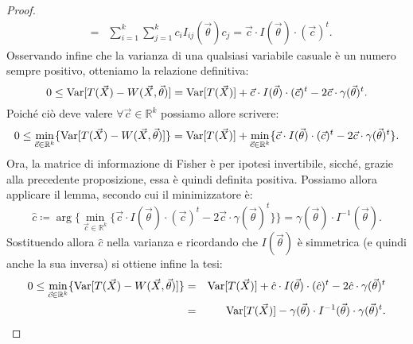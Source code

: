 \begin{proof}
\begin{eqnarray*}
&=& \sum_{i=1}^k \sum_{j=1}^k   c_i I_{ij}(\vec{\theta})c_j = \vec{c}\cdot I(\vec{\theta})\cdot (\vec{c})^t.
\end{eqnarray*}
Osservando infine che la varianza di una qualsiasi variabile casuale è un numero sempre positivo, otteniamo la relazione definitiva: 
$$0\leq \operatorname{Var}[T(\vec{X})-W(\vec{X}, \vec{\theta})]= \operatorname{Var}[T(\vec{X})] + \vec{c}\cdot I(\vec{\theta})\cdot (\vec{c})^t -2\vec{c}\cdot \gamma(\vec{\theta})^t.$$
Poiché ciò deve valere $\forall \vec{c}\in \mathbb{R}^k$ possiamo allore scrivere:
$$ 0\leq \min_{\vec{c}\in \mathbb{R}^k} \{\operatorname{Var}[T(\vec{X})-W(\vec{X}, \vec{\theta})]\}=\operatorname{Var}[T(\vec{X})] + 
 \min_{\vec{c}\in \mathbb{R}^k} \{\vec{c}\cdot I(\vec{\theta})\cdot (\vec{c})^t -2\vec{c}\cdot \gamma(\vec{\theta})^t\}.$$
Ora, la matrice di informazione di Fisher è per ipotesi invertibile, sicché, grazie alla precedente proposizione, essa è quindi definita positiva. Possiamo allora applicare il lemma, secondo cui il minimizzatore è: 
$$\hat{c}\coloneqq \arg\big\{\min_{\vec{c}\in \mathbb{R}^k} \{\vec{c}\cdot I(\vec{\theta})\cdot (\vec{c})^t -2\vec{c}\cdot \gamma(\vec{\theta})^t\}\big\}= \gamma(\vec{\theta})\cdot I^{-1}(\vec{\theta}).$$
Sostituendo allora $\hat{c}$ nella varianza e ricordando che $I(\vec{\theta})$ è simmetrica (e quindi anche la sua inversa) si ottiene infine la tesi:
\begin{eqnarray*}
0\leq \min_{\vec{c}\in \mathbb{R}^k} \{\operatorname{Var}[T(\vec{X})-W(\vec{X}, \vec{\theta})]\} &=& \operatorname{Var}[T(\vec{X})] + \hat{c}\cdot I(\vec{\theta})\cdot (\hat{c})^t -2\hat{c}\cdot \gamma(\vec{\theta})^t \\
&=& \operatorname{Var}[T(\vec{X})] - \gamma(\vec{\theta})\cdot I^{-1}(\vec{\theta}) \cdot \gamma(\vec{\theta})^t.
\end{eqnarray*}
\end{proof}


